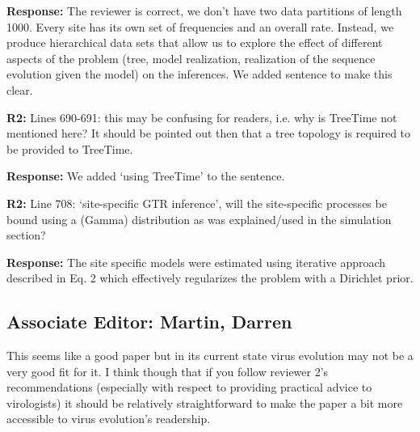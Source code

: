 \documentclass[aps,rmp,onecolumn]{revtex4-1}
\newcommand{\refb}[1]{\textbf{R2:} #1}
\newcommand{\response}[1]{{\color{black}\textbf{Response:} #1}}
\begin{document}
\response{The reviewer is correct, we don't have two data partitions of length 1000.
Every site has its own set of frequencies and an overall rate.
Instead, we produce hierarchical data sets that allow us to explore the effect of different aspects of the problem (tree, model realization, realization of the sequence evolution given the model) on the inferences.
We added sentence to make this clear. }


\refb{Lines 690-691: this may be confusing for readers, i.e. why is TreeTime not mentioned here? It should be pointed out then that a tree topology is required to be provided to TreeTime.}

\response{We added `using TreeTime' to the sentence.}

\refb{Line 708: ‘site-specific GTR inference’, will the site-specific processes be bound using a (Gamma) distribution as was explained/used in the simulation section?}

\response{The site specific models were estimated using iterative approach described in Eq. 2 which effectively regularizes the problem with a Dirichlet prior. }

\subsection*{Associate Editor: Martin, Darren}

This seems like a good paper but in its current state virus evolution may not be a very good fit for it.  I think though that if you follow reviewer 2's recommendations (especially with respect to providing practical advice to virologists) it should be relatively straightforward to make the paper a bit more accessible to virus evolution's readership.
\end{document}
